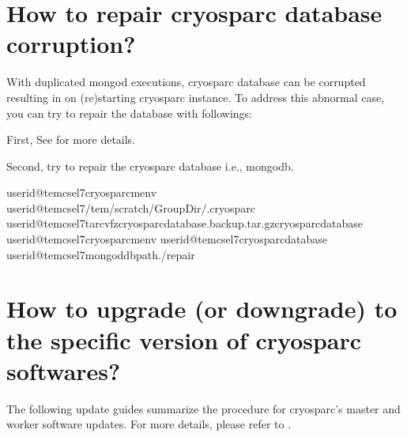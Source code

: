 \documentclass[a4paper,10pt,english]{sphinxmanual}
\begin{document}
\section{How to repair cryosparc database corruption?}
\label{\detokenize{faq:how-to-repair-cryosparc-database-corruption}}\label{\detokenize{faq:how-to-repair-cryosparc-database-corruption-caused-by-duplicated-mongod-executions}}
\sphinxAtStartPar
With duplicated mongod executions, cryosparc database can be corrupted resulting in  on (re)starting cryosparc instance. To address this abnormal case, you can try to repair the database with followings:

\sphinxAtStartPar
First,  See {\hyperref[\detokenize{faq:how-to-resolve-the-problems-on-re-starting-your-own-cryosparc-instance}]{}}  for more details.

\sphinxAtStartPar
Second, try to repair the cryosparc database i.e., mongodb.

\begin{sphinxVerbatim}[commandchars=\\\{\}]
userid@tem\PYGZhy{}cs\PYGZhy{}el7\PYGZdl{}\PYGZgt{}cryosparcmenv
userid@tem\PYGZhy{}cs\PYGZhy{}el7\PYGZdl{}\PYGZgt{}/tem/scratch/\PYGZlt{}GroupDir\PYGZgt{}/.cryosparc
userid@tem\PYGZhy{}cs\PYGZhy{}el7\PYGZdl{}\PYGZgt{}tarcvfzcryosparc\PYGZus{}database.backup.tar.gzcryosparc\PYGZus{}database
userid@tem\PYGZhy{}cs\PYGZhy{}el7\PYGZdl{}\PYGZgt{}cryosparcmenv
userid@tem\PYGZhy{}cs\PYGZhy{}el7\PYGZdl{}\PYGZgt{}cryosparc\PYGZus{}database
userid@tem\PYGZhy{}cs\PYGZhy{}el7\PYGZdl{}\PYGZgt{}mongod\PYGZhy{}\PYGZhy{}dbpath./\PYGZhy{}\PYGZhy{}repair
\end{sphinxVerbatim}


\section{How to upgrade (or downgrade) to the specific version of cryosparc softwares?}
\label{\detokenize{faq:how-to-upgrade-or-downgrade-to-the-specific-version-of-cryosparc-softwares}}\label{\detokenize{faq:how-to-update-cryosparc-softwares}}
\sphinxAtStartPar
The following update guides summarize the procedure for cryosparc’s master and worker software updates.
For more details, please refer to .
\end{document}
